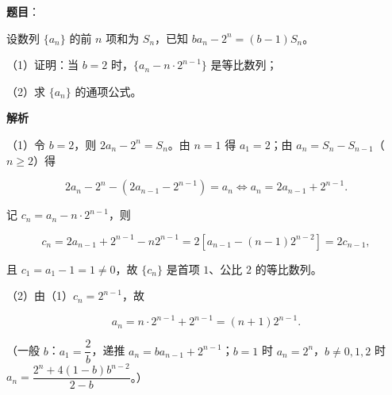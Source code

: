 \begin{answer}

\textbf{题目}：

设数列 $\{a_n\}$ 的前 $n$ 项和为 $S_n$，已知 $ba_n-2^n=(b-1)S_n$。

（1）证明：当 $b=2$ 时，$\{a_n-n\cdot2^{n-1}\}$ 是等比数列；

（2）求 $\{a_n\}$ 的通项公式。

\textbf{解析}

（1）令 $b=2$，则 $2a_n-2^n=S_n$。由 $n=1$ 得 $a_1=2$；由 $a_n=S_n-S_{n-1}$（$n\geqslant2$）得

\nopagebreak[4]
\[2a_n-2^n-(2a_{n-1}-2^{n-1})=a_n\iff a_n=2a_{n-1}+2^{n-1}.\]

记 $c_n=a_n-n\cdot2^{n-1}$，则

\nopagebreak[4]
\[c_n=2a_{n-1}+2^{n-1}-n2^{n-1}=2\left[a_{n-1}-(n-1)2^{n-2}\right]=2c_{n-1},\]

且 $c_1=a_1-1=1\neq0$，故 $\{c_n\}$ 是首项 $1$、公比 $2$ 的等比数列。

（2）由（1）$c_n=2^{n-1}$，故

\nopagebreak[4]
\[a_n=n\cdot2^{n-1}+2^{n-1}=(n+1)2^{n-1}.\]

（一般 $b$：$a_1=\dfrac2b$，递推 $a_n=ba_{n-1}+2^{n-1}$；$b=1$ 时 $a_n=2^n$，$b\neq0,1,2$ 时 $a_n=\dfrac{2^n+4(1-b)b^{n-2}}{2-b}$。）


\end{answer}
